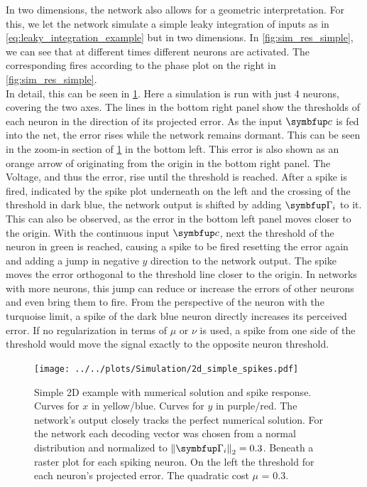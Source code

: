 In two dimensions, the network also allows for a geometric interpretation. For this, we let the network simulate a simple leaky integration of inputs as in \cref{eq:leaky_integration_example} but in two dimensions. In \cref{fig:sim_res_simple}, we can see that at different times different neurons are activated. The corresponding fires according to the phase plot on the right in \cref{fig:sim_res_simple}.\\
In detail, this can be seen in \cref{fig:sim_res_geometric}. Here a simulation is run with just 4 neurons, covering the two axes. The lines in the bottom right panel show the thresholds of each neuron in the direction of its projected error. As the input $\bmu{c}$ is fed into the net, the error rises while the network remains dormant. This can be seen in the zoom-in section of \cref{fig:sim_res_geometric} in the bottom left. This error is also shown as an orange arrow of originating from the origin in the bottom right panel. The Voltage, and thus the error, rise until the threshold is reached. After a spike is fired, indicated by the spike plot underneath on the left and the crossing of the threshold in dark blue, the network output is shifted by adding $\bmu{\Gamma}_i$ to it. This can also be observed, as the error in the bottom left panel moves closer to the origin. With the continuous input $\bmu{c}$, next the threshold of the neuron in green is reached, causing a spike to be fired resetting the error again and adding a jump in negative $y$ direction to the network output. The spike moves the error orthogonal to the threshold line closer to the origin. In networks with more neurons, this jump can reduce or increase the errors of other neurons and even bring them to fire. From the perspective of the neuron with the turquoise limit, a spike of the dark blue neuron directly increases its perceived error. If no regularization in terms of $\mu$ or $\nu$ is used, a spike from one side of the threshold would move the signal exactly to the opposite neuron threshold.
\begin{figure}[h!]
	\centering
	\texttt{[image: ../../plots/Simulation/2d\_simple\_spikes.pdf]}
	\caption{Simple 2D example with numerical solution and spike response. Curves for $x$ in yellow/blue. Curves for $y$ in purple/red. The network's output closely tracks the perfect numerical solution. For the network each decoding vector was chosen from a normal distribution and normalized to $\left\lVert\bmu{\Gamma}_i\right\rVert_2 =0.3$. Beneath a raster plot for each spiking neuron. On the left the threshold for each neuron's projected error. The quadratic cost $\mu$ = 0.3.}
	\label{fig:sim_res_geometric}
\end{figure}


